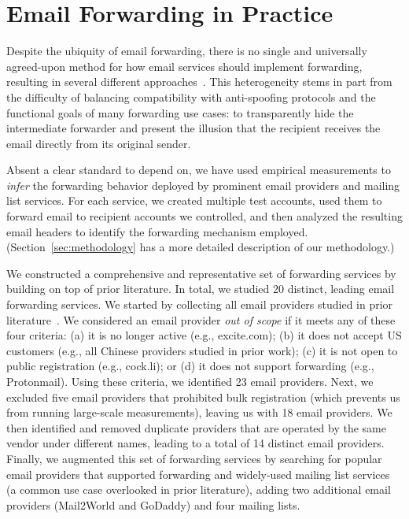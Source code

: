 \section{Email Forwarding in Practice}
\label{sec:measure_forwarding_mechs_and_arc}

Despite the ubiquity of email forwarding, there is no single and
universally agreed-upon method for how email services should implement
forwarding, resulting in several different approaches~\cite{Emailfor34:online}.  This
heterogeneity stems in part from the difficulty of balancing
compatibility with anti-spoofing protocols and the functional goals of
many forwarding use cases: to transparently hide the intermediate
forwarder and present the illusion that the recipient receives the
email directly from its original sender.

Absent a clear standard to depend on, we have used empirical
measurements to \emph{infer} the forwarding behavior deployed by
prominent email providers and mailing list services.  For each
service, we created multiple test accounts, used them to forward email
to recipient accounts we controlled, and then analyzed the resulting
email headers to identify the forwarding mechanism employed.
(Section~\ref{sec:methodology} has a more detailed description of our
methodology.)

We constructed a comprehensive and representative set of forwarding services by building on top of prior literature.
In total, we studied 20 distinct, leading email forwarding services.
We started by collecting all email providers studied in prior literature~\cite{chen2020composition,shen2020weak,hu_end--end_nodate,wang2022revisiting}.
We considered an email provider \emph{out of scope} if it meets any of these four criteria: (a) it is no longer active (e.g., excite.com); (b) it does not accept US customers (e.g., all Chinese providers studied in prior work);  (c) it is not open to public registration (e.g., cock.li); or (d) it does not support forwarding (e.g., Protonmail).
Using these criteria, we identified 23 email providers.
Next, we excluded five email providers that prohibited bulk registration (which prevents us from running large-scale measurements), leaving us with 18 email providers.
We then identified and removed duplicate providers that are operated by the same vendor under different names, leading to a total of 14 distinct email providers.
Finally, we augmented this set of forwarding services by searching for popular email providers that supported forwarding and widely-used mailing list services (a common use case overlooked in prior literature), adding two additional email providers (Mail2World and GoDaddy) and four mailing lists.

